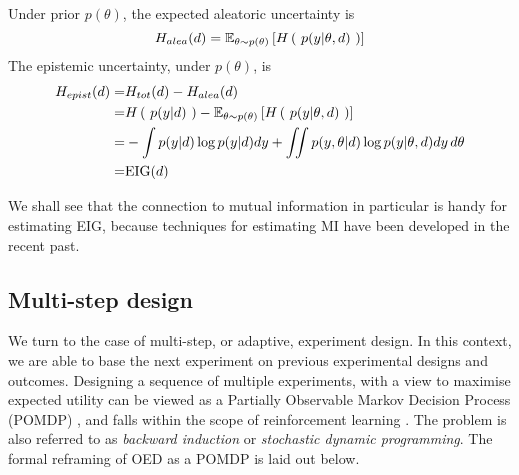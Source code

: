 \begin{enumerate}
Under prior $p(\theta)$, the expected aleatoric uncertainty is
\begin{equation}
	H_{alea}(d) = \mathbb{E}_{\theta \sim p(\theta)}\left[ H\left(\ p(y|\theta, d)\ \right) \right]
\end{equation}
The epistemic uncertainty, under $p(\theta)$, is
\begin{align}
	H_{epist}(d) =& H_{tot}(d) - H_{alea}(d)\\
	=&H\left(\ p(y|d)\ \right) - \mathbb{E}_{\theta \sim p(\theta)}\left[ H\left(\ p(y|\theta, d)\ \right) \right] \\
	=&-\int p(y|d)\log p(y|d)dy + \iint p(y, \theta | d)\log p(y|\theta, d) dy \, d\theta\\
	=& \text{EIG}(d)
\end{align}

\end{enumerate}
We shall see that the connection to mutual information in particular is handy for estimating EIG, because techniques for estimating MI have been developed in the recent past.


\subsection{Multi-step design}
We turn to the case of multi-step, or adaptive, experiment design. In this context, we are able to base the next experiment on previous experimental designs and outcomes. Designing a sequence of multiple experiments, with a view to maximise expected utility can be viewed as a Partially Observable Markov Decision Process (POMDP) \cite{marchant2014}, and falls within the scope of reinforcement learning \cite{pang2018}. The problem is also referred to as \textit{backward induction} or \textit{stochastic dynamic programming}. The formal reframing of OED as a POMDP is laid out below.

